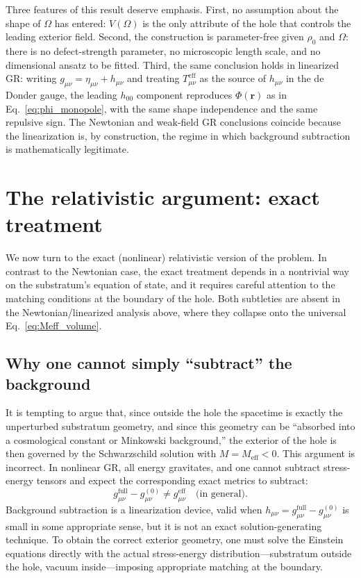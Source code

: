 \documentclass[%
  reprint,
  superscriptaddress,
  showpacs,
  showkeys,
  amsmath,amssymb,
  pra,
  longbibliography,
  floatfix,
  x11names
]{revtex4-2}
\begin{document}
Three features of this result deserve emphasis. First, no assumption about the shape of $\Omega$ has entered: $V(\Omega)$ is the only attribute of the hole that controls the leading exterior field. Second, the construction is parameter-free given $\rho_0$ and $\Omega$: there is no defect-strength parameter, no microscopic length scale, and no dimensional ansatz to be fitted. Third, the same conclusion holds in linearized GR: writing $g_{\mu\nu} = \eta_{\mu\nu} + h_{\mu\nu}$ and treating $T^{\mathrm{eff}}_{\mu\nu}$ as the source of $h_{\mu\nu}$ in the de Donder gauge, the leading $h_{00}$ component reproduces $\Phi(\mathbf{r})$ as in Eq.~\eqref{eq:phi_monopole}, with the same shape independence and the same repulsive sign. The Newtonian and weak-field GR conclusions coincide because the linearization is, by construction, the regime in which background subtraction is mathematically legitimate.

\section{The relativistic argument: exact treatment}
\label{sec:relativistic}

We now turn to the exact (nonlinear) relativistic version of the problem. In contrast to the Newtonian case, the exact treatment depends in a nontrivial way on the substratum's equation of state, and it requires careful attention to the matching conditions at the boundary of the hole. Both subtleties are absent in the Newtonian/linearized analysis above, where they collapse onto the universal Eq.~\eqref{eq:Meff_volume}.

\subsection{Why one cannot simply ``subtract'' the background}
\label{sec:no_subtraction}

It is tempting to argue that, since outside the hole the spacetime is exactly the unperturbed substratum geometry, and since this geometry can be ``absorbed into a cosmological constant or Minkowski background,'' the exterior of the hole is then governed by the Schwarzschild solution with $M = M_{\mathrm{eff}} < 0$. This argument is incorrect. In nonlinear GR, all energy gravitates, and one cannot subtract stress-energy tensors and expect the corresponding exact metrics to subtract:
\begin{equation}
g^{\mathrm{full}}_{\mu\nu} - g^{(0)}_{\mu\nu} \neq g^{\mathrm{eff}}_{\mu\nu}\quad\text{(in general)}.
\label{eq:no_metric_subtraction}
\end{equation}
Background subtraction is a linearization device, valid when $h_{\mu\nu} = g^{\mathrm{full}}_{\mu\nu} - g^{(0)}_{\mu\nu}$ is small in some appropriate sense, but it is not an exact solution-generating technique. To obtain the correct exterior geometry, one must solve the Einstein equations directly with the actual stress-energy distribution---substratum outside the hole, vacuum inside---imposing appropriate matching at the boundary.
\end{document}
